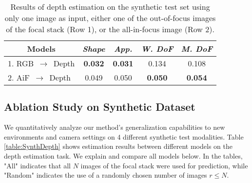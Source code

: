 \documentclass[10pt,twocolumn,letterpaper]{article}
\begin{document}
\begin{table*}[]
\begin{center}
{\begin{tabular}{l|c|c||c|c||c|c||cc}
\end{tabular}}
\end{center}
\vspace{-0.2cm}
\caption{Results on the synthetic data test sets for depth estimation models with focal stacks (FS) as input. {\it Row 1.} Direct depth prediction with a fixed-sized AE.  {\it Row 2.} Direct depth prediction with the proposed AE with global pooling. 
{\it Row 3.} Depth prediction for our method, using the predicted defocus map as supervisory signal.  }
\label{table:SynthDepth}
\end{table*} \begin{table}[]
\begin{center}
\begin{tabular}{l|cccc}
\hline
\multicolumn{1}{c|}{Models} & {\it Shape}      & {\it App.}       &  {\it W. DoF}          &  {\it M. DoF}        \\ \hline
1. RGB $\,\to\,$ Depth             & \textbf{0.032} & \textbf{0.031} & 0.134          & 0.108          \\ \hline
2. AiF $\,\to\,$ Depth             & 0.049          & 0.050          & \textbf{0.050} & \textbf{0.054} \\ \hline
\end{tabular}
\end{center}
\vspace{-0.2cm}
\caption{Results of depth estimation on the synthetic test set using only one image as input, either one of the out-of-focus images of the focal stack (Row 1), or the all-in-focus image (Row 2).}
\label{table:SynthDptOne}
\end{table} 



\subsection{Ablation Study on Synthetic Dataset}
We quantitatively analyze our method’s generalization capabilities to new environments and camera settings on 4 different synthetic test modalities.
Table \ref{table:SynthDepth} shows estimation results between different models on the depth estimation task.  
We explain and compare all models below.
In the tables, "All" indicates that all $N$ images of the focal stack were used for prediction, while "Random" indicates the use of a randomly chosen number of images $r \leq N$.
\end{document}
